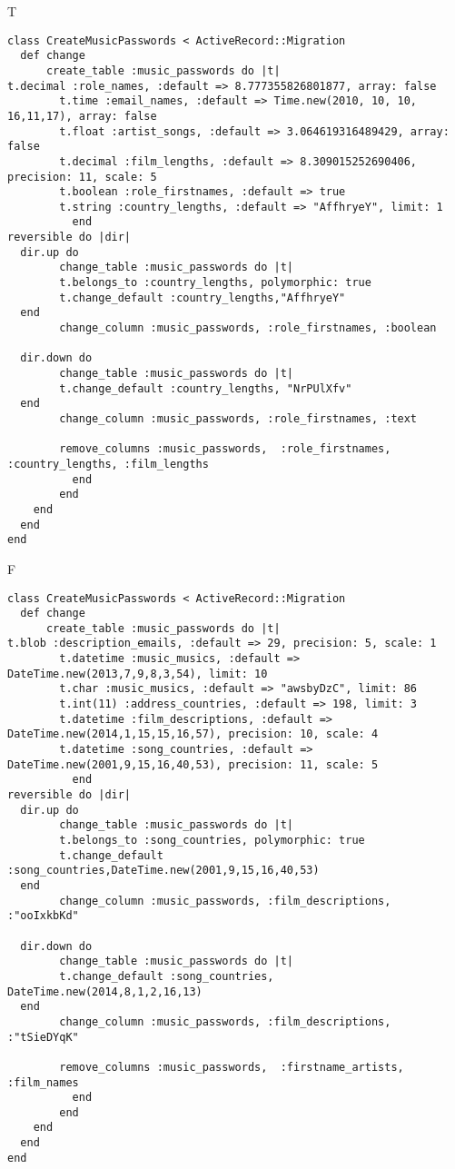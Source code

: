 T
\begin{verbatim}
class CreateMusicPasswords < ActiveRecord::Migration
  def change
	  create_table :music_passwords do |t|
t.decimal :role_names, :default => 8.777355826801877, array: false
		t.time :email_names, :default => Time.new(2010, 10, 10, 16,11,17), array: false
		t.float :artist_songs, :default => 3.064619316489429, array: false
		t.decimal :film_lengths, :default => 8.309015252690406, precision: 11, scale: 5
		t.boolean :role_firstnames, :default => true
		t.string :country_lengths, :default => "AffhryeY", limit: 1
		  end
reversible do |dir|
  dir.up do
		change_table :music_passwords do |t|
		t.belongs_to :country_lengths, polymorphic: true
 		t.change_default :country_lengths,"AffhryeY"
  end
 		change_column :music_passwords, :role_firstnames, :boolean
   
  dir.down do
		change_table :music_passwords do |t|
		t.change_default :country_lengths, "NrPUlXfv"
  end
 		change_column :music_passwords, :role_firstnames, :text
   
		remove_columns :music_passwords,  :role_firstnames, :country_lengths, :film_lengths 
	      end
	    end
    end 
  end
end

\end{verbatim}

F
\begin{verbatim}
class CreateMusicPasswords < ActiveRecord::Migration
  def change
	  create_table :music_passwords do |t|
t.blob :description_emails, :default => 29, precision: 5, scale: 1
		t.datetime :music_musics, :default => DateTime.new(2013,7,9,8,3,54), limit: 10
		t.char :music_musics, :default => "awsbyDzC", limit: 86
		t.int(11) :address_countries, :default => 198, limit: 3
		t.datetime :film_descriptions, :default => DateTime.new(2014,1,15,15,16,57), precision: 10, scale: 4
		t.datetime :song_countries, :default => DateTime.new(2001,9,15,16,40,53), precision: 11, scale: 5
		  end
reversible do |dir|
  dir.up do
		change_table :music_passwords do |t|
		t.belongs_to :song_countries, polymorphic: true
 		t.change_default :song_countries,DateTime.new(2001,9,15,16,40,53)
  end
 		change_column :music_passwords, :film_descriptions, :"ooIxkbKd"
   
  dir.down do
		change_table :music_passwords do |t|
		t.change_default :song_countries, DateTime.new(2014,8,1,2,16,13)
  end
 		change_column :music_passwords, :film_descriptions, :"tSieDYqK"
   
		remove_columns :music_passwords,  :firstname_artists, :film_names 
	      end
	    end
    end 
  end
end

\end{verbatim}

